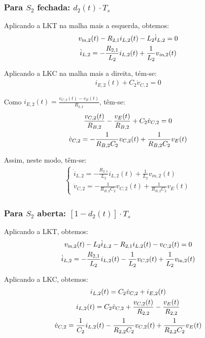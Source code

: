 \documentclass{article}
\newcommand{\ds}{\displaystyle}
\newcommand{\nle}{%
  \notag \\[0pt]
}
\begin{document}
\subsubsection*{Para $S_2$ fechada: $d_2(t) \cdot T_s$}

Aplicando a LKT na malha mais a esquerda, obtemos:
\begin{gather}
  v_{\text{in}, 2}(t) - R_{2,1} i_{L,2}(t) - L_2 \dot i_{L,2} = 0  \nle
  \dot i_{L,2} = - \frac{R_{2,1}}{L_2} i_{L,2}(t) + \frac{1}{L_2} v_{\textit{in}, 2}(t)
\end{gather}

Aplicando a LKC na malha mais a direita, tém-se:
\begin{gather}
  i_{E,2}(t) + C_2 \dot{v}_{C,2} = 0
\end{gather}

Como $i_{E,2}(t) = \ds \frac{v_{C,2}(t) - v_E(t)}{R_{2,2}}$, têm-se:
\begin{gather}
  \frac{v_{C,2}(t)}{R_{B,2}} - \frac{v_E(t)}{R_{B,2}} + C_2 \dot{v}_{C,2} = 0 \nle
  \dot{v}_{C,2} = - \frac{1}{R_{B,2} C_2} v_{C,2}(t) + \frac{1}{R_{B,2} C_2} v_{E}(t)
\end{gather}

Assim, neste modo, têm-se:
\begin{gather}
  \begin{cases}
    \dot i_{L,2} = \ds - \frac{R_{2,1}}{L_2} i_{L,2}(t) + \frac{1}{L_2} v_{\textit{in}, 2}(t) \\[12pt]
    \dot{v}_{C,2} = \ds - \frac{1}{R_{B,2} C_2} v_{C,2}(t) + \frac{1}{R_{B,2} C_2} v_{E}(t)
  \end{cases}
\end{gather}

\vspace*{8pt}
\subsubsection*{Para $S_2$ aberta: $\left[1 - d_2(t)\right] \cdot T_s$}

Aplicando a LKT, obtemos:
\begin{gather}
  v_{\text{in}, 2}(t) - L_2 \dot i_{L,2} - R_{2,1} i_{L,2} (t) - v_{C,2} (t)= 0 \nle
  \dot i_{L,2} = - \frac{R_{2,1}}{L_2} i_{L,2}(t) - \frac{1}{L_2} v_{C,2}(t) + \frac{1}{L_2} v_{\text{in}, 2}(t)
\end{gather}

Aplicando a LKC, obtemos:
\begin{gather}
  i_{L,2}(t) = C_2 \dot v_{C,2} + i_{E,2}(t) \nle
  i_{L,2}(t) = C_2 \dot v_{C,2} +  \frac{v_{C,2}(t)}{R_{2,2}} - \frac{v_E(t)}{R_{2,2}} \nle
  \dot{v}_{C,2} =  \frac{1}{C_2} i_{L,2}(t) - \frac{1}{R_{2,2}C_2} v_{C,2}(t) + \frac{1}{R_{2,2} C_2} v_E(t)
\end{gather}
\end{document}
